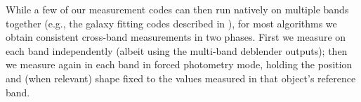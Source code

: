 While a few of our measurement codes can then run natively on multiple bands together (e.g., the galaxy fitting codes described in ), for most algorithms we obtain consistent cross-band measurements in two phases.
First we measure on each band independently (albeit using the multi-band deblender outputs); then we measure again in each band in forced photometry mode, holding the position and (when relevant) shape fixed to the values measured in that object's reference band.
